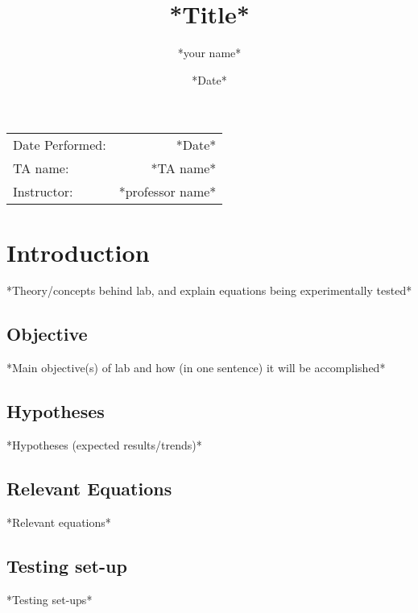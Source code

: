 \documentclass[
	letterpaper, %
	10pt, %
]{labby boi}
\title{*Title*
} %
\author{*your name*} %
\date{*Date*} %
\begin{document}
\maketitle %

\begin{center}
	\begin{tabular}{l r}
		Date Performed: & *Date* \\ %
		TA name: & *TA name* \\ %
		Instructor: & *professor name* %
	\end{tabular}
\end{center}



\vspace{5in}
\section{Introduction}
*Theory/concepts behind lab, and explain equations being experimentally tested*
\subsection{Objective}
*Main objective(s) of lab and how (in one sentence) it will be accomplished*\\
\subsection{Hypotheses}
*Hypotheses (expected results/trends)*
\subsection{Relevant Equations}
*Relevant equations*
\subsection{Testing set-up}
*Testing set-ups*
\end{document}
